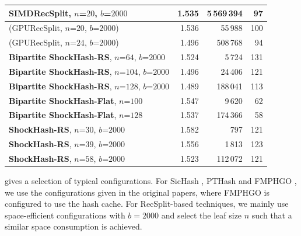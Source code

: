 \documentclass[a4paper,USenglish,cleveref]{lipics-v2021}
\begin{document}
\begin{table}[t]
\begin{centering}
\begin{tabular}[t]{l rrr}
                        SIMDRecSplit, $n$=$20$, $b$=$2000$ & 1.535 & 5\,569\,394 &  97 \\ \midrule
                       (GPURecSplit, $n$=$20$, $b$=$2000$) & 1.536 &     55\,988 & 100 \\
                       (GPURecSplit, $n$=$24$, $b$=$2000$) & 1.496 &    508\,768 &  94 \\ \midrule
     \textbf{Bipartite ShockHash-RS}, $n$=$64$, $b$=$2000$ & 1.524 &      5\,724 & 131 \\
    \textbf{Bipartite ShockHash-RS}, $n$=$104$, $b$=$2000$ & 1.496 &     24\,406 & 121 \\
    \textbf{Bipartite ShockHash-RS}, $n$=$128$, $b$=$2000$ & 1.489 &    188\,041 & 113 \\ \midrule
              \textbf{Bipartite ShockHash-Flat}, $n$=$100$ & 1.547 &      9\,620 &  62 \\
              \textbf{Bipartite ShockHash-Flat}, $n$=$128$ & 1.537 &    174\,366 &  58 \\ \midrule
               \textbf{ShockHash-RS}, $n$=$30$, $b$=$2000$ & 1.582 &         797 & 121 \\
               \textbf{ShockHash-RS}, $n$=$39$, $b$=$2000$ & 1.556 &      1\,813 & 123 \\
               \textbf{ShockHash-RS}, $n$=$58$, $b$=$2000$ & 1.523 &    112\,072 & 121 \\

    \bottomrule
\end{tabular}
\end{centering}

\end{table}


\def\speedupSIMD156{76}







\def\maxSpeedupNonSimdPlainRotate{195}

\def\maxSpeedupNonSimdPlain{25}

 gives a selection of typical configurations.
For SicHash \cite{lehmann2023sichash}, PTHash \cite{pibiri2021pthash} and FMPHGO \cite{beling2023fingerprinting}, we use the configurations given in the original papers, where FMPHGO is configured to use the hash cache.
For RecSplit-based techniques, we mainly use space-efficient configurations with $b=2000$ and select the leaf size $n$ such that a similar space consumption is achieved.
\end{document}
